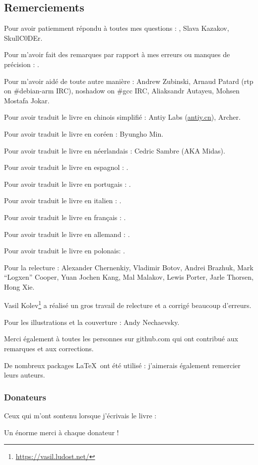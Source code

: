 \subsection*{Remerciements}

Pour avoir patiemment répondu à toutes mes questions : \HERMIT, Slava  Kazakov, SkullC0DEr.

Pour m'avoir fait des remarques par rapport à mes erreurs ou manques de précision : \PeopleMistakesInaccuracies{}.

Pour m'avoir aidé de toute autre manière :
Andrew Zubinski,
Arnaud Patard (rtp on \#debian-arm IRC),
noshadow on \#gcc IRC,
Aliaksandr Autayeu,
Mohsen Mostafa Jokar.

Pour avoir traduit le livre en chinois simplifié :
Antiy Labs (\href{http://antiy.cn}{antiy.cn}), Archer.

Pour avoir traduit le livre en coréen : Byungho Min.

Pour avoir traduit le livre en néerlandais : Cedric Sambre (AKA Midas).

Pour avoir traduit le livre en espagnol : \PeopleSpanishTranslators{}.

Pour avoir traduit le livre en portugais : \PeoplePTBRTranslators{}.

Pour avoir traduit le livre en italien : \PeopleItalianTranslators{}.

Pour avoir traduit le livre en français : \PeopleFrenchTranslators{}.

Pour avoir traduit le livre en allemand : \PeopleGermanTranslators{}.

Pour avoir traduit le livre en polonais: \PeoplePolishTranslators{}.

Pour la relecture :
Alexander  Chernenkiy,
Vladimir Botov,
Andrei Brazhuk,
Mark ``Logxen'' Cooper, Yuan Jochen Kang, Mal Malakov, Lewis Porter, Jarle Thorsen, Hong Xie.

Vasil Kolev\footnote{\url{https://vasil.ludost.net/}} a réalisé un gros travail de relecture et a corrigé beaucoup d'erreurs.

Pour les illustrations et la couverture : Andy Nechaevsky.

Merci également à toutes les personnes sur github.com qui ont contribué aux remarques et aux corrections\FNGithubContributors{}.

De nombreux packages \LaTeX\ ont été utilisé : j'aimerais également remercier leurs auteurs.

\subsubsection*{Donateurs}

Ceux qui m'ont sontenu lorsque j'écrivais le livre :



Un énorme merci à chaque donateur !
